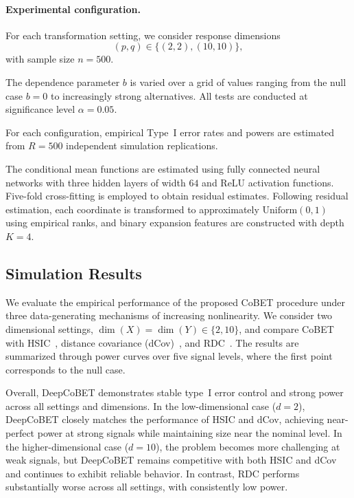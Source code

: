 \documentclass[12pt,reqno,oneside]{amsbook}
\theoremstyle{definition}
\theoremstyle{remark}
\begin{document}
\paragraph{Experimental configuration.}
For each transformation setting, we consider response dimensions
\[
(p,q)\in\{(2,2),(10,10)\},
\]
with sample size
$
n=500.
$

The dependence parameter $b$ is varied over a grid of values ranging from the
null case $b=0$ to increasingly strong alternatives. All tests are conducted at
significance level
$
\alpha=0.05.
$

For each configuration, empirical Type~I error rates and powers are estimated
from $R=500$ independent simulation replications.

The conditional mean functions are estimated using fully connected neural
networks with three hidden layers of width $64$ and ReLU activation functions.
Five-fold cross-fitting is employed to obtain residual estimates. Following
residual estimation, each coordinate is transformed to approximately
$\mathrm{Uniform}(0,1)$ using empirical ranks, and binary expansion features
are constructed with depth $K=4$.



\subsection{Simulation Results}

We evaluate the empirical performance of the proposed CoBET procedure under
three data-generating mechanisms of increasing nonlinearity. We consider two
dimensional settings, $\dim(X)=\dim(Y)\in\{2,10\}$, and compare CoBET with
HSIC~\cite{Gretton2005HSIC}, distance covariance (dCov)~\cite{Szekely2007}, and
RDC~\cite{LopezPaz2017}. The results are summarized through power curves over
five signal levels, where the first point corresponds to the null case.

Overall, DeepCoBET demonstrates stable type~I error control and strong power across
all settings and dimensions. In the low-dimensional case ($d=2$), DeepCoBET closely
matches the performance of HSIC and dCov, achieving near-perfect power at strong
signals while maintaining size near the nominal level. In the higher-dimensional
case ($d=10$), the problem becomes more challenging at weak signals, but DeepCoBET
remains competitive with both HSIC and dCov and continues to exhibit reliable
behavior. In contrast, RDC performs substantially worse across all settings,
with consistently low power.
\end{document}
